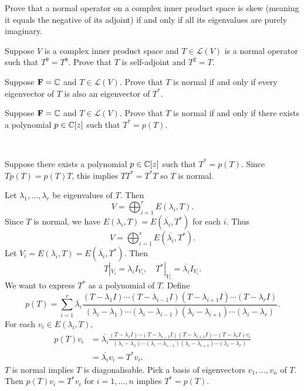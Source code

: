 \begin{exercise}
Prove that a normal operator on a complex inner product space is skew (meaning it equals the negative of its adjoint) if and only if all its eigenvalues are purely imaginary.
\end{exercise}

\begin{exercise}
Suppose $V$ is a complex inner product space and $T\in\mathcal{L}(V)$ is a normal operator such that $T^9=T^8$. Prove that $T$ is self-adjoint and $T^2=T$.
\end{exercise}

\begin{exercise}
Suppose $\mathbf F=\mathbb C$ and $T\in\mathcal{L}(V)$. Prove that $T$ is normal if and only if every eigenvector of $T$ is also an eigenvector of $T^*$.
\end{exercise}

\begin{exercise}
Suppose $\mathbf F=\mathbb C$ and $T\in\mathcal{L}(V)$. Prove that $T$ is normal if and only if there exists a polynomial $p\in\mathbb C[z]$ such that $T^*=p(T)$.
\end{exercise}

\begin{solution} \

\fbox{$\impliedby$} Suppose there exists a polynomial $p\in\mathbb C[z]$ such that $T^*=p(T)$. Since $Tp(T)=p(T)T$, this implies $TT^*=T^*T$ so $T$ is normal.

\fbox{$\implies$} Let $\lambda_1,\dots,\lambda_r$ be eigenvalues of $T$. Then
\[V=\bigoplus_{i=1}^{r}E(\lambda_i,T).\]
Since $T$ is normal, we have $E(\lambda_i,T)=E(\overline{\lambda_i},T^*)$ for each $i$. Thus
\[V=\bigoplus_{i=1}^{r}E(\overline{\lambda_i},T^*).\]
Let $V_i=E(\lambda_i,T)=E(\overline{\lambda_i},T^*)$. Then
\[T|_{V_i}=\lambda_i I_{V_i},\quad T^*|_{V_i}=\overline{\lambda_i} I_{V_i}.\]
We want to express $T^*$ as a polynomial of $T$. 
Define
\[p(T)=\sum_{i=1}^{r}\overline{\lambda_i}\frac{(T-\lambda_1 I)\cdots(T-\lambda_{i-1}I)(T-\lambda_{i+1}I)\cdots(T-\lambda_r I)}{(\lambda_i-\lambda_1)\cdots(\lambda_i-\lambda_{i-1})(\lambda_i-\lambda_{i+1})\cdots(\lambda_i-\lambda_r)}.\]
For each $v_i\in E(\lambda_i,T)$,
\begin{align*}
p(T)v_i
&=\overline{\lambda_i}\frac{(T-\lambda_1 I)\cdots(T-\lambda_{i-1}I)(T-\lambda_{i+1}I)\cdots(T-\lambda_r I)v_i}{(\lambda_i-\lambda_1)\cdots(\lambda_i-\lambda_{i-1})(\lambda_i-\lambda_{i+1})\cdots(\lambda_i-\lambda_r)}\\
&=\overline{\lambda_i}v_i=T^*v_i.
\end{align*}
$T$ is normal implies $T$ is diagonalisable. 
Pick a basis of eigenvectors $v_1,\dots,v_n$ of $T$. 
Then $p(T)v_i=T^*v_i$ for $i=1,\dots,n$ implies $T^*=p(T)$.
\end{solution}

